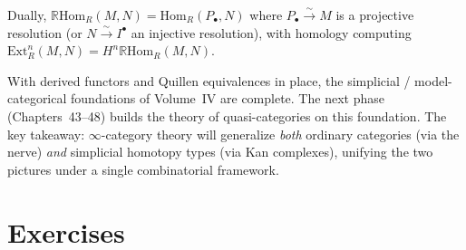 \begin{example_thm}
\label{ex:derived-hom}
Dually, $\mathbb{R}\mathrm{Hom}_R(M, N) = \mathrm{Hom}_R(P_\bullet, N)$
where $P_\bullet \xrightarrow{\sim} M$ is a projective resolution
(or $N \xrightarrow{\sim} I^\bullet$ an injective resolution), with
homology computing $\mathrm{Ext}^n_R(M, N) = H^n \mathbb{R}\mathrm{Hom}_R(M, N)$.
\end{example_thm}

\begin{remark}
With derived functors and Quillen equivalences in place, the
simplicial / model-categorical foundations of Volume~IV are complete.
The next phase (Chapters~43--48) builds the theory of quasi-categories
on this foundation. The key takeaway: $\infty$-category theory will
generalize \emph{both} ordinary categories (via the nerve) \emph{and}
simplicial homotopy types (via Kan complexes), unifying the two pictures
under a single combinatorial framework.
\end{remark}


\section{Exercises}
\label{sec:derived-exercises}

